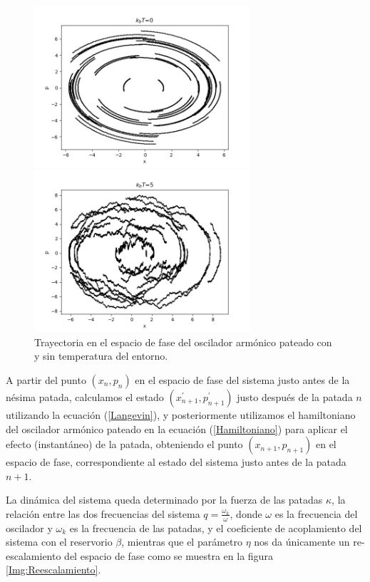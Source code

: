 \documentclass[letterpaper,12pt,oneside]{book}
\begin{document}
	\begin{figure} 
		\centering 
		\begin{minipage}{0.45\textwidth}
			\centering 
			\includegraphics[width=8cm]{Figures/noT}
		\end{minipage}
		\begin{minipage}{0.45\textwidth}
			\centering 
			\includegraphics[width=8cm]{Figures/10T}
		\end{minipage}
		
		\caption{Trayectoria en el espacio de fase del oscilador armónico pateado con y sin temperatura del entorno.}
		\label{fig.Temp0vsTempFinita}
	\end{figure}
	
	 A partir del punto $(x_n, p_n)$ en el espacio de fase del sistema justo antes de la n\'esima patada, calculamos el estado $(x_{n+1}^{'}, p_{n+1}^{'})$ justo despu\'es de la patada $n$ utilizando la ecuaci\'on (\ref{Langevin}), y posteriormente utilizamos el hamiltoniano del oscilador arm\'onico pateado en la ecuaci\'on (\ref{Hamiltoniano}) para aplicar el efecto (instant\'aneo) de la patada, obteniendo el punto $(x_{n+1}, p_{n+1})$ en el espacio de fase, correspondiente al estado del sistema justo antes de la patada $n+1$.
	
	La dinámica del sistema queda determinado por la fuerza de las patadas $\kappa$, la relación entre las dos frecuencias del sistema $q = \frac{\omega_k}{\omega}$, donde $\omega$ es la frecuencia del oscilador y $\omega_k$ es la frecuencia de las patadas, y el coeficiente de acoplamiento del sistema con el reservorio $\beta$, mientras que el parámetro $\eta$ nos da únicamente un  re-escalamiento del espacio de fase \cite{PradoTesis} como se muestra en la figura \ref{Img:Reescalamiento}.
	
\end{document}
